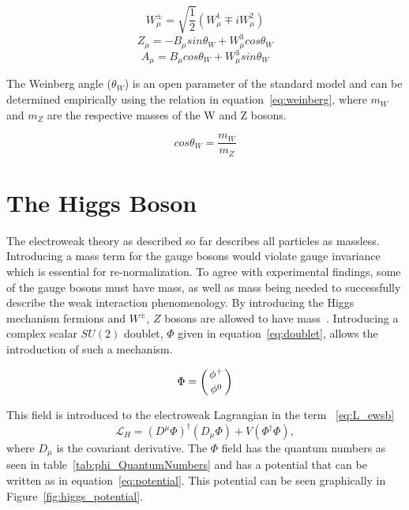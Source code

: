 \begin{equation} W^{\pm}_{\mu} = \sqrt{\dfrac{1}{2}}(W^1_{\mu} \mp iW^2_{\mu}) \label{eq:Ws}\end{equation}
\begin{equation} Z_{\mu} = -B_{\mu} sin \theta_W + W^3_{\mu} cos \theta_W \label{eq:Z}\end{equation}
\begin{equation} A_{\mu} = B_{\mu} cos \theta_W + W^3_{\mu} sin \theta_W \label{eq:gamma}\end{equation}

The Weinberg angle ($\theta_W$) is an open parameter of the standard model and can be determined empirically using the relation in equation~\ref{eq:weinberg}, where $m_W$ and $m_Z$ are the respective masses of the W and Z bosons. 

\begin{equation} cos \theta_W = \dfrac{m_W}{m_Z} \label{eq:weinberg}\end{equation}









\section{The Higgs Boson}

The electroweak theory as described so far describes all particles as massless.  Introducing a mass term for the gauge bosons would violate gauge invariance which is essential for re-normalization.  To agree with experimental findings, some of the gauge bosons must have mass, as well as mass being needed to successfully describe the weak interaction phenomenology. By introducing the Higgs mechanism fermions and $W^{\pm}$, $Z$ bosons are allowed to have mass~\cite{Dawson98}.   Introducing a complex scalar $S U(2)$ doublet, $\Phi$ given in equation~\ref{eq:doublet}, allows the introduction of such a mechanism.

\begin{equation} \Phi = \left( \genfrac{}{}{0pt}{}{\phi^+}{\phi^0}  \right) \label{eq:doublet}\end{equation}

This field is introduced to the electroweak Lagrangian in the term ~\ref{eq:L_ewsb} \begin{equation} \mathcal{L}_{H}  = (D^{\mu}\Phi)^{\dagger}(D_{\mu}\Phi) + V(\Phi^{\dagger} \Phi), \label{eq:L_ewsb}\end{equation} where $D_{\mu}$ is the covariant derivative. The $\Phi$ field has the quantum numbers as seen in table~\ref{tab:phi_QuantumNumbers} and has a potential that can be written as in equation~\ref{eq:potential}.  This potential can be seen graphically in Figure~\ref{fig:higgs_potential}.

